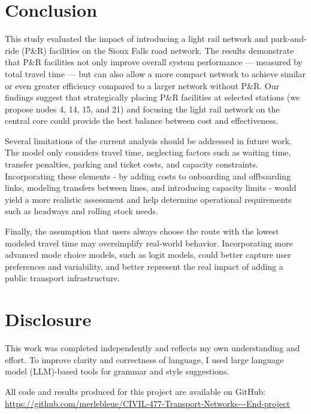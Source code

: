\section{Conclusion}

This study evaluated the impact of introducing a light rail network and park-and-ride (P\&R) facilities on the Sioux Falls road network. The results demonstrate that P\&R facilities not only improve overall system performance — measured by total travel time — but can also allow a more compact network to achieve similar or even greater efficiency compared to a larger network without P\&R. Our findings suggest that strategically placing P\&R facilities at selected stations (we propose nodes 4, 14, 15, and 21) and focusing the light rail network on the central core could provide the best balance between cost and effectiveness.

Several limitations of the current analysis should be addressed in future work. The model only considers travel time, neglecting factors such as waiting time, transfer penalties, parking and ticket costs, and capacity constraints. Incorporating these elements - by adding costs to onboarding and offboarding links, modeling transfers between lines, and introducing capacity limits - would yield a more realistic assessment and help determine operational requirements such as headways and rolling stock needs.

Finally, the assumption that users always choose the route with the lowest modeled travel time may oversimplify real-world behavior. Incorporating more advanced mode choice models, such as logit models, could better capture user preferences and variability, and better represent the real impact of adding a public transport infrastructure.

\vfill

\section*{Disclosure}

This work was completed independently and reflects my own understanding and effort. To improve clarity and correctness of language, I used large language model (LLM)-based tools for grammar and style suggestions.

All code and results produced for this project are available on GitHub: \url{https://github.com/merlebleue/CIVIL-477-Transport-Networks---End-project}